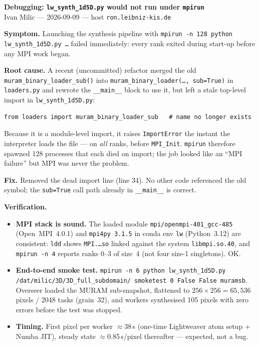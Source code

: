 \documentclass[11pt]{article}
\newcommand{\code}[1]{\texttt{\small #1}}
\begin{document}
{\large\textbf{Debugging: \code{lw\_synth\_1d5D.py} would not run under \code{mpirun}}}\\[-0.3em]
{\small Ivan Milic --- 2026-09-09 --- host \code{ron.leibniz-kis.de}}

\textbf{Symptom.} Launching the synthesis pipeline with \code{mpirun -n 128 python lw\_synth\_1d5D.py \ldots}
failed immediately: every rank exited during start-up before any MPI work began.

\textbf{Root cause.} A recent (uncommitted) refactor merged the old
\code{muram\_binary\_loader\_sub()} into \code{muram\_binary\_loader(\ldots, sub=True)} in
\code{loaders.py} and rewrote the \code{\_\_main\_\_} block to use it, but left a stale
top-level import in \code{lw\_synth\_1d5D.py}:
\begin{Verbatim}[fontsize=\small,xleftmargin=1.4em]
from loaders import muram_binary_loader_sub   # name no longer exists
\end{Verbatim}
Because it is a module-level import, it raises {\color{bad}\code{ImportError}} the instant the
interpreter loads the file --- on \emph{all} ranks, before \code{MPI\_Init}. \code{mpirun}
therefore spawned 128 processes that each died on import; the job looked like an
``MPI failure'' but MPI was never the problem.

\textbf{Fix.} Removed the dead import line (line 34). No other code referenced the old
symbol; the \code{sub=True} call path already in \code{\_\_main\_\_} is correct.

\textbf{Verification.}
\begin{itemize}
\item \textbf{MPI stack is sound.} The loaded module \code{mpi/openmpi-401\_gcc-485}
      (Open~MPI~4.0.1) and \code{mpi4py~3.1.5} in conda env \code{lw} (Python~3.12) are
      consistent: \code{ldd} shows \code{MPI.\ldots so} linked against the system
      \code{libmpi.so.40}, and \code{mpirun -n 4} reports ranks 0--3 of size~4 (not four
      size-1 singletons). {\color{good}OK.}
\item \textbf{End-to-end smoke test.} \code{mpirun -n 6 python lw\_synth\_1d5D.py
      /dat/milic/3D/3D\_full\_subdomain/ smoketest 0 False False muramsb}. Overseer loaded
      the MURAM sub-snapshot, flattened to $256\times256=65{,}536$ pixels / 2048 tasks
      (grain~32), and workers synthesised {\color{good}105 pixels with zero errors}
      before the test was stopped.
\item \textbf{Timing.} First pixel per worker $\approx$38\,s (one-time Lightweaver atom
      setup + Numba JIT), steady state $\approx$0.85\,s/pixel thereafter --- expected, not a bug.
\end{itemize}
\end{document}
